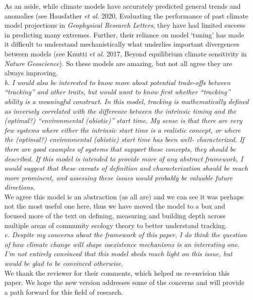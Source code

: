 \documentclass[11pt]{article}
\begin{document}
As an aside, while climate models have accurately predicted general trends and anomalies (see Hausfather \emph{et al.} 2020, Evaluating the performance of past climate model projections in \emph{Geophysical Research Letters}, they have had limited success in predicting many extremes. Further, their reliance on model `tuning' has made it difficult to understand mechanistically what underlies important divergences between models (see Knutti \emph{et al.} 2017, Beyond equilibrium climate sensitivity in \emph{Nature Geoscience}). So these models are amazing, but not all agree they are always improving. \\

\emph{b.      I would also be interested to know more about potential trade-offs between ``tracking''
and other traits, but would want to know first whether ``tracking'' ability is a meaningful
construct. In this model, tracking is mathematically defined as inversely correlated with the
difference between the intrinsic timing and the (optimal?) ``environmental (abiotic)'' start
time. My sense is that there are very few systems where either the intrinsic start time is a
realistic concept, or where the (optimal?) environmental (abiotic) start time has been well-
characterized. If there are good examples of systems that support these concepts, they should
be described. If this model is intended to provide more of any abstract framework, I would
suggest that these caveats of definition and characterization should be much more prominent,
and assessing these issues would probably be valuable future directions.}\\

We agree this model is an abstraction (as all are) and we can see it was perhaps not the most useful one here, thus we have moved the model to a box and focused more of the text on defining, measuring and building depth across multiple areas of community ecology theory to better understand tracking.\\

\emph{c.      Despite my concerns about the framework of this paper, I do think the question of how
climate change will shape coexistence mechanisms is an interesting one. I'm not entirely
convinced that this model sheds much light on this issue, but would be glad to be convinced
otherwise.}\\

We thank the reviewer for their comments, which helped us re-envision this paper. We hope the new version addresses some of the concerns and will provide a path forward for this field of research.\\
\end{document}
